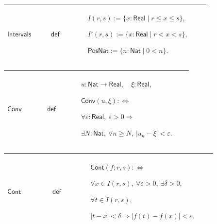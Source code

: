 \documentclass[12pt,reqno]{amsart}
\theoremstyle{blueplain}
\numberwithin{equation}{section}
\begin{document}
{\scriptsize \setlength{\parskip}{0pt}\nointerlineskip
\noindent 
\begin{tabular}{|@{}>{\centering\arraybackslash}m{0.19251\linewidth}|>{\centering\arraybackslash}m{0.16845\linewidth}|>{\centering\arraybackslash}m{0.53904\linewidth}|}
\hline
\hypertarget{def:Intervals}{$\displaystyle \mathsf{Intervals}$} & $%
\displaystyle \mathsf{def}$ & $\displaystyle I(r,s):=\{x:\mathsf{Real}\mid
r\le x\le s\},$\par$\displaystyle I^\circ(r,s):=\{x:\mathsf{Real}\mid
r<x<s\},$\par$\displaystyle \mathsf{PosNat}:=\{n:\mathsf{Nat}\mid0<n\}.$ \\ 
\hline
\end{tabular}%
}

{\scriptsize \setlength{\parskip}{0pt}\nointerlineskip
\noindent 
\begin{tabular}{|@{}>{\centering\arraybackslash}m{0.19251\linewidth}|>{\centering\arraybackslash}m{0.16845\linewidth}|>{\centering\arraybackslash}m{0.53904\linewidth}|}
\hline
\hypertarget{def:Conv}{$\displaystyle \mathsf{Conv}$} & $\displaystyle 
\mathsf{def}$ & $\displaystyle u:\mathsf{Nat}\to\mathsf{Real},\quad\xi:%
\mathsf{Real},$\par$\displaystyle \mathsf{Conv}(u,\xi):\Longleftrightarrow$%
\par$\displaystyle \forall\varepsilon:\mathsf{Real},\
\varepsilon>0\Rightarrow$\par$\displaystyle \exists N:\mathsf{Nat},\ \forall
n\ge N,\ |u_n-\xi|<\varepsilon.$ \\ \hline
\end{tabular}%
}

{\scriptsize \setlength{\parskip}{0pt}\nointerlineskip
\noindent 
\begin{tabular}{|@{}>{\centering\arraybackslash}m{0.19251\linewidth}|>{\centering\arraybackslash}m{0.16845\linewidth}|>{\centering\arraybackslash}m{0.53904\linewidth}|}
\hline
\hypertarget{def:Cont}{$\displaystyle \mathsf{Cont}$} & $\displaystyle 
\mathsf{def}$ & $\displaystyle \mathsf{Cont}(f;r,s):\Longleftrightarrow$\par$%
\displaystyle \forall x\in I(r,s),\ \forall\varepsilon>0,\ \exists\delta>0,$%
\par$\displaystyle \forall t\in I(r,s),$\par$\displaystyle %
|t-x|<\delta\Rightarrow|f(t)-f(x)|<\varepsilon.$ \\ \hline
\end{tabular}%
}
\end{document}
